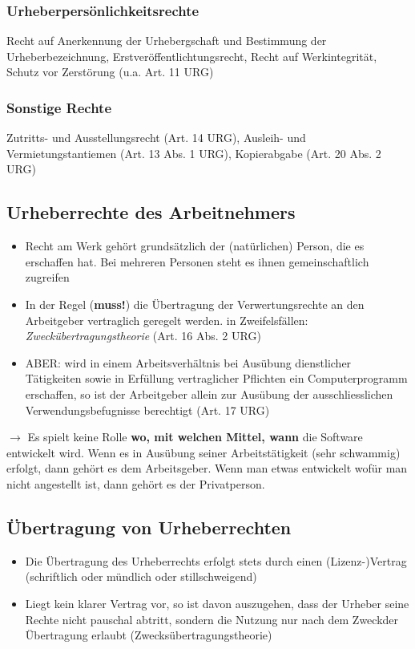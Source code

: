 \documentclass{report}
\theoremstyle{definition}
\theoremstyle{example}
\begin{document}
\subsubsection{Urheberpersönlichkeitsrechte}
Recht auf Anerkennung der Urhebergschaft und Bestimmung der Urheberbezeichnung, Erstveröffentlichtungsrecht, Recht auf Werkintegrität, Schutz vor Zerstörung (u.a. Art. 11 URG)

\subsubsection{Sonstige Rechte}
Zutritts- und Ausstellungsrecht (Art. 14 URG), Ausleih- und Vermietungstantiemen (Art. 13 Abs. 1 URG), Kopierabgabe (Art. 20 Abs. 2 URG)


\subsection{Urheberrechte des Arbeitnehmers}
\begin{itemize}
   \item Recht am Werk gehört grundsätzlich der (natürlichen) Person, die es erschaffen hat. Bei mehreren Personen steht es ihnen gemeinschaftlich zugreifen
   \item In der Regel (\textbf{muss!}) die Übertragung der Verwertungsrechte an den Arbeitgeber vertraglich geregelt werden. in Zweifelsfällen: \textit{Zweckübertragungstheorie} (Art. 16 Abs. 2 URG)
   \item ABER: wird in einem Arbeitsverhältnis bei Ausübung dienstlicher Tätigkeiten sowie in Erfüllung vertraglicher Pflichten ein Computerprogramm erschaffen, so ist der Arbeitgeber allein zur Ausübung der ausschliesslichen Verwendungsbefugnisse berechtigt (Art. 17 URG)
\end{itemize}
$\rightarrow$ Es spielt keine Rolle \textbf{wo, mit welchen Mittel, wann} die Software entwickelt wird. Wenn es in Ausübung seiner Arbeitstätigkeit (sehr schwammig) erfolgt, dann gehört es dem Arbeitsgeber.
Wenn man etwas entwickelt wofür man nicht angestellt ist, dann gehört es der Privatperson.

\subsection{Übertragung von Urheberrechten}
\begin{itemize}
   \item Die Übertragung des Urheberrechts erfolgt stets durch einen (Lizenz-)Vertrag (schriftlich oder mündlich oder stillschweigend)
   \item Liegt kein klarer Vertrag vor, so ist davon auszugehen, dass der Urheber seine Rechte nicht pauschal abtritt, sondern die Nutzung nur nach dem Zweckder Übertragung erlaubt (Zwecksübertragungstheorie)
\end{itemize}
\end{document}
